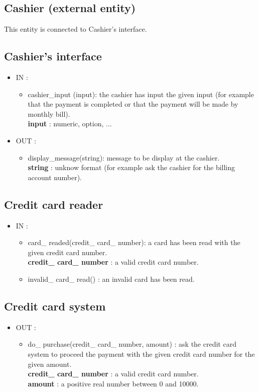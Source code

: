 \documentclass[11pt,a4paper]{article}
\begin{document}
\subsection{Cashier (external entity)}
This entity is connected to Cashier's interface.
\subsection{Cashier's interface}
\begin{itemize}
\item IN : 
	\begin{itemize}
		\item cashier\_input (input): the cashier has input the given input (for example that the payment is completed or that the payment will be made by monthly bill). \\
		\textbf{input} : numeric, option, ...
	\end{itemize}
\item OUT :
	\begin{itemize}
		\item display\_message(string): message to be display at the cashier. \\
		\textbf{string} : unknow format (for example ask the cashier for the billing account number).
	\end{itemize}
\end{itemize}


\subsection{Credit card reader}
\begin{itemize}
\item IN : 
	\begin{itemize}
		\item card\_ readed(credit\_ card\_ number): a card has been read with the given credit card number. \\
		\textbf{credit\_ card\_ number} : a valid credit card number.
		\item invalid\_ card\_ read() : an invalid card has been read.
	\end{itemize}
\end{itemize}

\subsection{Credit card system}
\begin{itemize}
\item OUT : 
	\begin{itemize}
		\item  do\_ purchase(credit\_ card\_ number, amount) : ask the credit card system to proceed the payment with the given credit card number for the given amount. \\
		\textbf{credit\_ card\_ number} : a valid credit card number. \\
		\textbf{amount} : a positive real number between 0 and 10000.
	\end{itemize}
\end{itemize}
\end{document}

